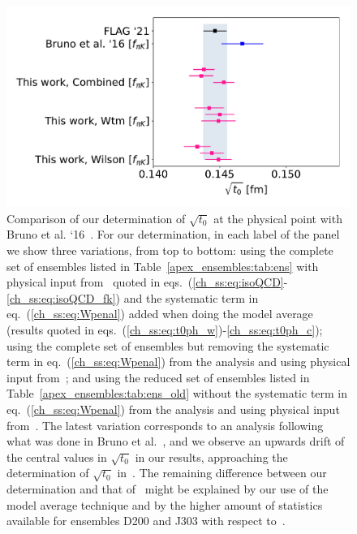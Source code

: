 \begin{figure}
    \centering
    \includegraphics[width=1.\textwidth]{./cap5/figs/t0_compar_FLAG.pdf}
    \caption{Comparison of our determination of $\sqrt{t_0}$ at the physical point with Bruno et al. `16~\citep{Bruno:2016plf}. For our determination, in each label of the panel we show three variations, from top to bottom: using the complete set of ensembles listed in Table~\ref{apex_ensembles:tab:ens} with physical input from~\citep{FlavourLatticeAveragingGroupFLAG:2021npn} quoted in eqs.~(\ref{ch_ss:eq:isoQCD}-\ref{ch_ss:eq:isoQCD_fk}) and the systematic term in eq.~(\ref{ch_ss:eq:Wpenal}) added when doing the model average (results quoted in eqs.~(\ref{ch_ss:eq:t0ph_w})-\ref{ch_ss:eq:t0ph_c}); using the complete set of ensembles but removing the systematic term in eq.~(\ref{ch_ss:eq:Wpenal}) from the analysis and using physical input from~\citep{FLAG16}; and using the reduced set of ensembles listed in Table~\ref{apex_ensembles:tab:ens_old} without the systematic term in eq.~(\ref{ch_ss:eq:Wpenal}) from the analysis and using physical input from~\citep{FLAG16}. The latest variation corresponds to an analysis following what was done in Bruno et al.~\citep{Bruno:2016plf}, and we observe an upwards drift of the central values in $\sqrt{t_0}$ in our results, approaching the determination of $\sqrt{t_0}$ in~\citep{Bruno:2016plf}. The remaining difference between our determination and that of~\citep{Bruno:2016plf} might be explained by our use of the model average technique and by the higher amount of statistics available for ensembles D200 and J303 with respect to~\citep{Bruno:2016plf}.}
    \label{ch_ss:fig:FLAG}
\end{figure}

